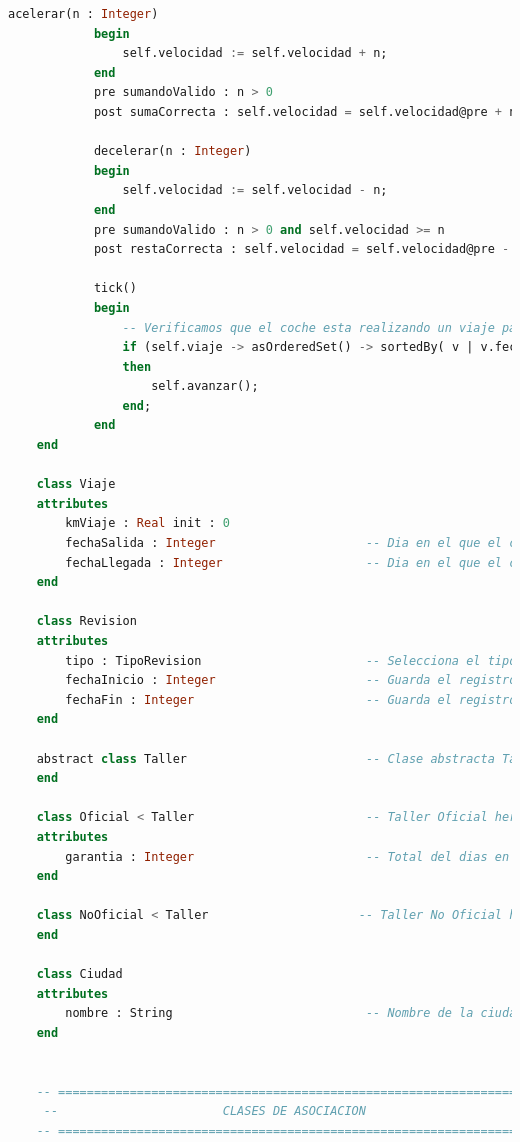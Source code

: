 \documentclass[12pt.a4paper]{article}
\begin{document}
\begin{lstlisting}[style = useNormal,language=SQL, caption={Codigo Use del apartado B}]
            acelerar(n : Integer)
            begin
                self.velocidad := self.velocidad + n;
            end
            pre sumandoValido : n > 0
            post sumaCorrecta : self.velocidad = self.velocidad@pre + n
    
            decelerar(n : Integer)
            begin
                self.velocidad := self.velocidad - n;
            end 
            pre sumandoValido : n > 0 and self.velocidad >= n
            post restaCorrecta : self.velocidad = self.velocidad@pre - n
    
            tick()
            begin
                -- Verificamos que el coche esta realizando un viaje para llamar la operacion de avanzar
                if (self.viaje -> asOrderedSet() -> sortedBy( v | v.fechaSalida) -> last()).fechaLlegada = null and self.ciudad.oclIsUndefined()
                then
                    self.avanzar();
                end;
            end
    end     
    
    class Viaje
    attributes
        kmViaje : Real init : 0
        fechaSalida : Integer                     -- Dia en el que el coche comienza en viaje
        fechaLlegada : Integer                    -- Dia en el que el coche finaliza el viaje 
    end
    
    class Revision
    attributes
        tipo : TipoRevision                       -- Selecciona el tipo de revision del enumeration definido
        fechaInicio : Integer                     -- Guarda el registro de cuando inicio la revision del coche
        fechaFin : Integer                        -- Guarda el registro de cuando el coche sale de revision
    end
    
    abstract class Taller                         -- Clase abstracta Taller. No debe tener instancias, solo sus subclases tienen
    end
    
    class Oficial < Taller                        -- Taller Oficial hereda de Taller
    attributes
        garantia : Integer                        -- Total del dias en lo que el coche estara enGarantia
    end
    
    class NoOficial < Taller                     -- Taller No Oficial hereda de Taller
    end 
    
    class Ciudad
    attributes
        nombre : String                           -- Nombre de la ciudad
    end
    
    
    -- =====================================================================
     --                       CLASES DE ASOCIACION
    -- =====================================================================
    

\end{lstlisting}
\end{document}
